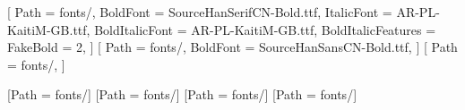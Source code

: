 [
    Path = fonts/,
    BoldFont = SourceHanSerifCN-Bold.ttf,
    ItalicFont = AR-PL-KaitiM-GB.ttf,
    BoldItalicFont = AR-PL-KaitiM-GB.ttf,
    BoldItalicFeatures = {FakeBold = 2},
]
[
    Path = fonts/,
    BoldFont = SourceHanSansCN-Bold.ttf,
]
[
    Path = fonts/,
]

[Path = fonts/]
[Path = fonts/]
[Path = fonts/]
[Path = fonts/]
\providecommand{\songti}{\CJKfamily{zhsong}}
\providecommand{\heiti}{\CJKfamily{zhhei}}
\providecommand{\kaishu}{\CJKfamily{zhkai}}
\providecommand{\fangsong}{\CJKfamily{zhfs}}
